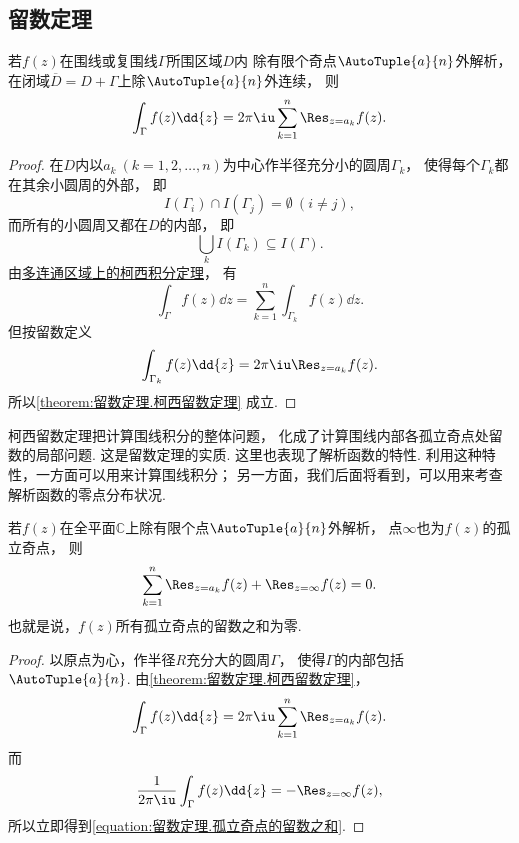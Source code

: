 \subsection{留数定理}
\begin{theorem}[柯西留数定理]\label{theorem:留数定理.柯西留数定理}
若\(f(z)\)在围线或复围线\(\Gamma\)所围区域\(D\)内
除有限个奇点\(\AutoTuple{a}{n}\)外解析，
在闭域\(\overline{D}=D+\Gamma\)上除\(\AutoTuple{a}{n}\)外连续，
则\begin{equation}\label{equation:留数定理.柯西留数定理}
	\int_\Gamma f(z) \dd{z}
	= 2\pi\iu \sum_{k=1}^n \Res_{z=a_k} f(z).
\end{equation}
\begin{proof}
在\(D\)内以\(a_k\ (k=1,2,\dotsc,n)\)为中心作半径充分小的圆周\(\Gamma_k\)，
使得每个\(\Gamma_k\)都在其余小圆周的外部，
即\begin{equation*}
	I(\Gamma_i) \cap I(\Gamma_j) = \emptyset\ (i \neq j),
\end{equation*}
而所有的小圆周又都在\(D\)的内部，
即\begin{equation*}
	\bigcup_k I(\Gamma_k) \subseteq I(\Gamma).
\end{equation*}
由\hyperref[theorem:解析函数的积分表示.多连通区域的柯西积分定理]{多连通区域上的柯西积分定理}，
有\begin{equation*}
	\int_\Gamma f(z) \dd{z}
	= \sum_{k=1}^n \int_{\Gamma_k} f(z) \dd{z}.
\end{equation*}
但按留数定义\begin{equation*}
	\int_{\Gamma_k} f(z) \dd{z} = 2\pi\iu \Res_{z=a_k} f(z).
\end{equation*}
所以\cref{theorem:留数定理.柯西留数定理} 成立.
\end{proof}
\end{theorem}
柯西留数定理把计算围线积分的整体问题，
化成了计算围线内部各孤立奇点处留数的局部问题.
这是留数定理的实质.
这里也表现了解析函数的特性.
利用这种特性，一方面可以用来计算围线积分；
另一方面，我们后面将看到，可以用来考查解析函数的零点分布状况.

\begin{theorem}\label{theorem:留数定理.孤立奇点的留数之和}
若\(f(z)\)在全平面\(\mathbb{C}\)上除有限个点\(\AutoTuple{a}{n}\)外解析，
点\(\infty\)也为\(f(z)\)的孤立奇点，
则\begin{equation}\label{equation:留数定理.孤立奇点的留数之和}
	\sum_{k=1}^n \Res_{z=a_k} f(z) + \Res_{z=\infty} f(z) = 0.
\end{equation}
也就是说，\(f(z)\)所有孤立奇点的留数之和为零.
\begin{proof}
以原点为心，作半径\(R\)充分大的圆周\(\Gamma\)，
使得\(\Gamma\)的内部包括\(\AutoTuple{a}{n}\).
由\cref{theorem:留数定理.柯西留数定理}，\begin{equation*}
	\int_\Gamma f(z) \dd{z}
	= 2\pi\iu \sum_{k=1}^n \Res_{z=a_k} f(z).
\end{equation*}
而\begin{equation*}
	\frac{1}{2\pi\iu} \int_\Gamma f(z) \dd{z}
	= -\Res_{z=\infty} f(z),
\end{equation*}
所以立即得到\cref{equation:留数定理.孤立奇点的留数之和}.
\end{proof}
\end{theorem}


